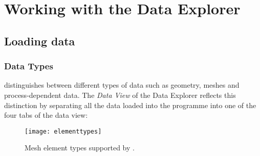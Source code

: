 \chapter{Working with the Data Explorer}

\section{Loading data}

\subsection{Data Types}
\label{datatypes}

\ogs distinguishes between different types of data such as geometry, meshes and process-dependent data. The \emph{Data View} of the Data Explorer reflects this distinction by separating all the data loaded into the programme into one of the four tabs of the data view:

\begin{figure}[tb]
\begin{center}
\texttt{[image: elementtypes]}
\caption{Mesh element types supported by \ogs.}
\label{fig:elements}
\end{center}
\end{figure}

